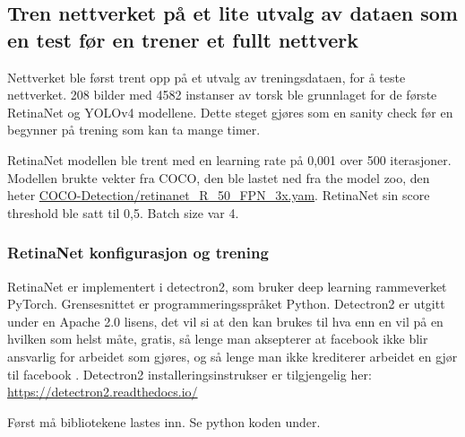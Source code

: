 \subsection{Tren nettverket på et lite utvalg av dataen som en test før en trener et fullt nettverk}

Nettverket ble først trent opp på et utvalg av treningsdataen, for å teste nettverket. 208 bilder med 4582 instanser av torsk ble grunnlaget for de første RetinaNet og YOLOv4 modellene. Dette steget gjøres som en sanity check før en begynner på trening som kan ta mange timer.

RetinaNet modellen ble trent med en learning rate på 0,001 over 500 iterasjoner. Modellen brukte vekter fra COCO, den ble lastet ned fra the model zoo, den heter \url{COCO-Detection/retinanet_R_50_FPN_3x.yam}. RetinaNet sin score threshold ble satt til 0,5. Batch size var 4.

\subsubsection{RetinaNet konfigurasjon og trening}

RetinaNet er implementert i detectron2, som bruker deep learning rammeverket PyTorch. Grensesnittet er programmeringsspråket Python. Detectron2 er utgitt under en Apache 2.0 lisens, det vil si at den kan brukes til hva enn en vil på en hvilken som helst måte, gratis, så lenge man aksepterer at facebook ikke blir ansvarlig for arbeidet som gjøres, og så lenge man ikke krediterer arbeidet en gjør til facebook \cite{The Apache Software Foundation 2004}. Detectron2 installeringsinstrukser er tilgjengelig her: \url{https://detectron2.readthedocs.io/}

Først må bibliotekene lastes inn. Se python koden under.

